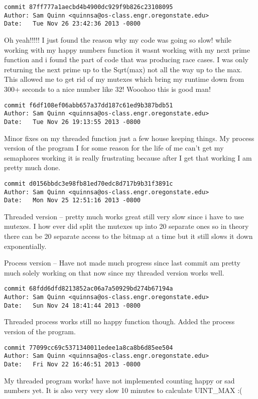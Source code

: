 \documentclass[letterpaper,10pt,notitlepage,fleqn]{article}
\begin{document}
\begin{verbatim}
commit 87ff777a1aecbd4b4900dc929f9b826c23108095
Author: Sam Quinn <quinnsa@os-class.engr.oregonstate.edu>
Date:   Tue Nov 26 23:42:36 2013 -0800
\end{verbatim}
    Oh yeah!!!!! I just found the reason why my code was going so slow! while working with my happy numbers function it wasnt working with my next prime function and i found the part of code that was producing race cases. I was only returning the next prime up to the Sqrt(max) not all the way up to the max. This allowed me to get rid of my mutexes which bring my runtime down from 300+ seconds to a nice number like 32! Wooohoo this is good man!

\begin{verbatim}
commit f6df108ef06abb657a37dd187c61ed9b387bdb51
Author: Sam Quinn <quinnsa@os-class.engr.oregonstate.edu>
Date:   Tue Nov 26 19:13:55 2013 -0800
\end{verbatim}
    Minor fixes on my threaded function just a few house keeping things. My process version of the program I for some reason for the life of me can't get my semaphores working it is really frustrating because after I get that working I am pretty much done.

\begin{verbatim}
commit d0156bbdc3e98fb81ed70edc8d717b9b31f3891c
Author: Sam Quinn <quinnsa@os-class.engr.oregonstate.edu>
Date:   Mon Nov 25 12:51:16 2013 -0800
\end{verbatim}
    Threaded version -- pretty much works great still very slow since i have to use mutexes. I how ever did split the mutexes up into 20 separate ones so in theory there can be 20 separate access to the bitmap at a time but it still slows it down exponentially.
    
    Process version -- Have not made much progress since last commit am pretty much solely working on that now since my threaded version works well.

\begin{verbatim}
commit 68fdd6dfd8213852ac06a7a50929bd274b67194a
Author: Sam Quinn <quinnsa@os-class.engr.oregonstate.edu>
Date:   Sun Nov 24 18:41:44 2013 -0800
\end{verbatim}
    Threaded process works still no happy function though. Added the process version of the program.

\begin{verbatim}
commit 77099cc69c5371340011edee1a8ca8b6d85ee504
Author: Sam Quinn <quinnsa@os-class.engr.oregonstate.edu>
Date:   Fri Nov 22 16:46:51 2013 -0800
\end{verbatim}
    My threaded program works! have not implemented counting happy or sad numbers yet. It is also very very slow 10 minutes to calculate UINT\_MAX :(
\end{document}

